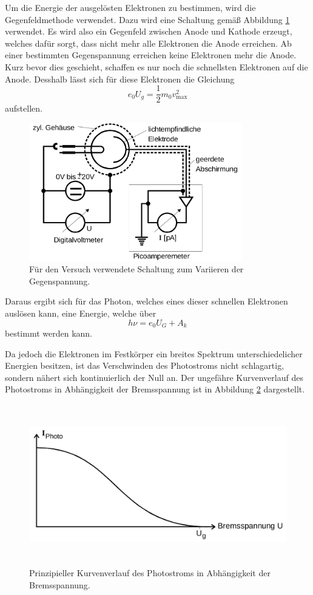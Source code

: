 Um die Energie der ausgelösten Elektronen zu bestimmen, wird die Gegenfeldmethode verwendet. Dazu wird eine Schaltung gemäß Abbildung \ref{fig:Schaltung} verwendet. Es wird also ein Gegenfeld zwischen Anode und Kathode erzeugt, welches dafür sorgt, dass nicht mehr alle Elektronen die Anode erreichen. Ab einer bestimmten Gegenspannung erreichen keine Elektronen mehr die Anode. Kurz bevor dies geschieht, schaffen es nur noch die schnellsten Elektronen auf die Anode. Desshalb lässt sich für diese Elektronen die Gleichung
\begin{equation}
    e_0 U_g=\frac{1}{2}m_0v_{\text{max}}^2
\end{equation}
aufstellen.

\begin{figure}
\centering
\includegraphics[height=6cm]{data/Schaltung.png}
\caption{Für den Versuch verwendete Schaltung zum Variieren der Gegenspannung.}
\label{fig:Schaltung}
\end{figure}

Daraus ergibt sich für das Photon, welches eines dieser schnellen Elektronen auslösen kann, eine Energie, welche über 
\begin{equation}
    h\nu=e_0 U_G + A_k
\end{equation}
bestimmt werden kann. 

Da jedoch die Elektronen im Festkörper ein breites Spektrum unterschiedelicher Energien besitzen, ist das Verschwinden des Photostroms nicht schlagartig, sondern nähert sich kontinuierlich der Null an. Der ungefähre Kurvenverlauf des Photostroms in Abhängigkeit der Bremsspannung ist in Abbildung \ref{fig:Kurve} dargestellt.

\begin{figure}
\centering
\includegraphics[height=7cm]{data/Kurve.png}
\caption{Prinzipieller Kurvenverlauf des Photostroms in Abhängigkeit der Bremsspannung.}
\label{fig:Kurve}
\end{figure}

